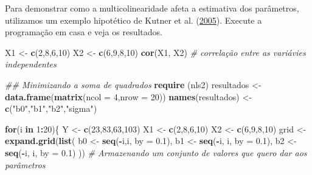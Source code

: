 \documentclass[
]{book}
\newenvironment{Shaded}{\begin{snugshade}}{\end{snugshade}}
\newcommand{\CommentTok}[1]{\textcolor[rgb]{0.56,0.35,0.01}{\textit{#1}}}
\newcommand{\ControlFlowTok}[1]{\textcolor[rgb]{0.13,0.29,0.53}{\textbf{#1}}}
\newcommand{\DataTypeTok}[1]{\textcolor[rgb]{0.13,0.29,0.53}{#1}}
\newcommand{\DecValTok}[1]{\textcolor[rgb]{0.00,0.00,0.81}{#1}}
\newcommand{\FloatTok}[1]{\textcolor[rgb]{0.00,0.00,0.81}{#1}}
\newcommand{\KeywordTok}[1]{\textcolor[rgb]{0.13,0.29,0.53}{\textbf{#1}}}
\newcommand{\NormalTok}[1]{#1}
\newcommand{\OperatorTok}[1]{\textcolor[rgb]{0.81,0.36,0.00}{\textbf{#1}}}
\newcommand{\StringTok}[1]{\textcolor[rgb]{0.31,0.60,0.02}{#1}}
\numberwithin{equation}{section}
\begin{document}
Para demonstrar como a multicolinearidade afeta a estimativa dos parâmetros, utilizamos um exemplo hipotético de Kutner et al. (\protect\hyperlink{ref-Kutner2005}{2005}). Execute a programação em casa e veja os resultados.

\begin{Shaded}
\begin{Highlighting}[]
\NormalTok{X1 \textless{}{-}}\StringTok{ }\KeywordTok{c}\NormalTok{(}\DecValTok{2}\NormalTok{,}\DecValTok{8}\NormalTok{,}\DecValTok{6}\NormalTok{,}\DecValTok{10}\NormalTok{)}
\NormalTok{X2 \textless{}{-}}\StringTok{ }\KeywordTok{c}\NormalTok{(}\DecValTok{6}\NormalTok{,}\DecValTok{9}\NormalTok{,}\DecValTok{8}\NormalTok{,}\DecValTok{10}\NormalTok{)}
\KeywordTok{cor}\NormalTok{(X1, X2) }\CommentTok{\# correlação entre as variávies independentes}

\CommentTok{\#\# Minimizando a soma de quadrados}
\KeywordTok{require}\NormalTok{ (nls2)}
\NormalTok{resultados \textless{}{-}}\StringTok{ }\KeywordTok{data.frame}\NormalTok{(}\KeywordTok{matrix}\NormalTok{(}\DataTypeTok{ncol =} \DecValTok{4}\NormalTok{,}\DataTypeTok{nrow =} \DecValTok{20}\NormalTok{))}
\KeywordTok{names}\NormalTok{(resultados) \textless{}{-}}\StringTok{ }\KeywordTok{c}\NormalTok{(}\StringTok{"b0"}\NormalTok{,}\StringTok{"b1"}\NormalTok{,}\StringTok{"b2"}\NormalTok{,}\StringTok{"sigma"}\NormalTok{)}

\ControlFlowTok{for}\NormalTok{(i }\ControlFlowTok{in} \DecValTok{1}\OperatorTok{:}\DecValTok{20}\NormalTok{)\{}
\NormalTok{Y \textless{}{-}}\StringTok{ }\KeywordTok{c}\NormalTok{(}\DecValTok{23}\NormalTok{,}\DecValTok{83}\NormalTok{,}\DecValTok{63}\NormalTok{,}\DecValTok{103}\NormalTok{)}
\NormalTok{X1 \textless{}{-}}\StringTok{ }\KeywordTok{c}\NormalTok{(}\DecValTok{2}\NormalTok{,}\DecValTok{8}\NormalTok{,}\DecValTok{6}\NormalTok{,}\DecValTok{10}\NormalTok{)}
\NormalTok{X2 \textless{}{-}}\StringTok{ }\KeywordTok{c}\NormalTok{(}\DecValTok{6}\NormalTok{,}\DecValTok{9}\NormalTok{,}\DecValTok{8}\NormalTok{,}\DecValTok{10}\NormalTok{)}
\NormalTok{grid \textless{}{-}}\StringTok{ }\KeywordTok{expand.grid}\NormalTok{(}\KeywordTok{list}\NormalTok{(}
\NormalTok{b0 \textless{}{-}}\StringTok{ }\KeywordTok{seq}\NormalTok{(}\OperatorTok{{-}}\NormalTok{i,i, }\DataTypeTok{by =} \FloatTok{0.1}\NormalTok{),}
\NormalTok{b1 \textless{}{-}}\StringTok{ }\KeywordTok{seq}\NormalTok{(}\OperatorTok{{-}}\NormalTok{i, i, }\DataTypeTok{by =} \FloatTok{0.1}\NormalTok{),}
\NormalTok{b2 \textless{}{-}}\StringTok{ }\KeywordTok{seq}\NormalTok{(}\OperatorTok{{-}}\NormalTok{i, i, }\DataTypeTok{by =} \FloatTok{0.1}\NormalTok{)}
\NormalTok{)) }\CommentTok{\# Armazenando um conjunto de valores que quero dar aos parâmetros}


\end{Highlighting}
\end{Shaded}
\end{document}
